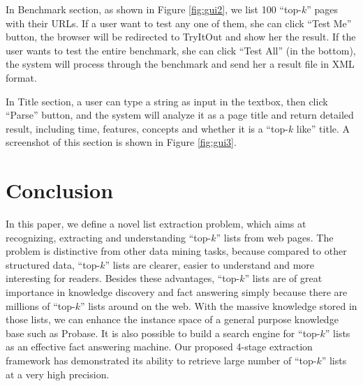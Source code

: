In Benchmark section, as shown in Figure \ref{fig:gui2}, 
we list 100 ``top-$k$'' pages with their URLs. If a user want to test any one 
of them, she can click ``Test Me'' button, 
the browser will be redirected to TryItOut and show her the result. 
If the user wants to test the entire benchmark, she can click 
``Test All'' (in the bottom), the system will process
through the benchmark and send her a result file in XML format. 

In Title section, a user can type a string as input in
the textbox, then click ``Parse'' button, and the system will analyze it 
as a page title and return detailed result, including time, features, 
concepts and whether it is a ``top-$k$ like'' title.
A screenshot of this section is shown in Figure \ref{fig:gui3}.

\section{Conclusion}


In this paper, we define a novel list extraction problem, 
which aims at recognizing, extracting
and understanding ``top-$k$'' lists from web pages. The problem is 
distinctive from other data mining tasks, because compared to other 
structured data, ``top-$k$'' lists are clearer, easier to understand and more
interesting for readers. Besides these advantages, 
``top-$k$'' lists are of great importance in knowledge discovery and 
fact answering simply because there are millions of ``top-$k$'' lists 
around on the web.
With the massive knowledge stored in those lists, we can enhance the 
instance space of a general purpose knowledge base such as Probase. 
It is also possible to build a search engine for ``top-$k$'' lists as 
an effective fact answering machine. Our proposed 4-stage 
extraction framework has demonstrated its ability to retrieve
large number of ``top-$k$'' lists at a very high precision.


